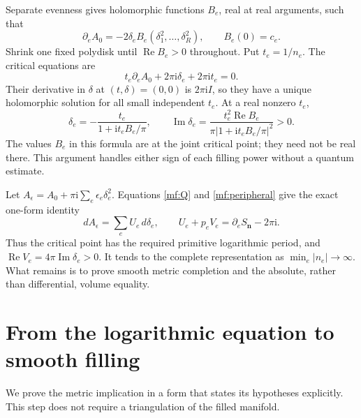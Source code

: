 \documentclass[11pt]{article}
\numberwithin{equation}{section}
\theoremstyle{definition}
\theoremstyle{remark}
\newcommand{\ii}{\mathrm i}
\newcommand{\Rea}{\operatorname{Re}}
\newcommand{\Ima}{\operatorname{Im}}
\begin{document}
Separate evenness gives holomorphic functions \(B_e\), real at real
arguments, such that
\[
 \partial_eA_0=-2\delta_e B_e(\delta_1^2,\ldots,\delta_R^2),
 \qquad B_e(0)=c_e.
\]
Shrink one fixed polydisk until \(\Rea B_e>0\) throughout.
Put \(t_e=1/n_e\). The critical equations are
\[
 t_e\partial_eA_0+2\pi\ii\delta_e+2\pi\ii t_e=0.
\]
Their derivative in \(\delta\) at \((t,\delta)=(0,0)\) is
\(2\pi\ii I\), so they have a unique holomorphic solution for all
small independent \(t_e\). At a real nonzero \(t_e\),
\begin{equation}\label{mf:sign}
 \delta_e=-\frac{t_e}{1+\ii t_eB_e/\pi},
 \qquad
 \Ima\delta_e=
 \frac{t_e^2\Rea B_e}
      {\pi|1+\ii t_eB_e/\pi|^2}>0 .
\end{equation}
The values \(B_e\) in this formula are at the joint critical point;
they need not be real there. This argument handles either sign of
each filling power without a quantum estimate.

Let \(A_\epsilon=A_0+\pi\ii\sum_e\epsilon_e\delta_e^2\).
Equations \eqref{mf:Q} and \eqref{mf:peripheral} give the exact
one-form identity
\begin{equation}\label{mf:action-peripheral}
 dA_\epsilon=\sum_e U_e\,d\delta_e,\qquad
 U_e+p_eV_e=\partial_e S_{\mathbf n}-2\pi\ii .
\end{equation}
Thus the critical point has the required primitive logarithmic
period, and \(\Rea V_e=4\pi\Ima\delta_e>0\).
It tends to the complete representation as
\(\min_e|n_e|\to\infty\). What remains is to prove smooth metric
completion and the absolute, rather than differential, volume equality.

\section{From the logarithmic equation to smooth filling}
\label{mf:completion}

We prove the metric implication in a form that states its hypotheses
explicitly. This step does not require a triangulation of the filled
manifold.
\end{document}
